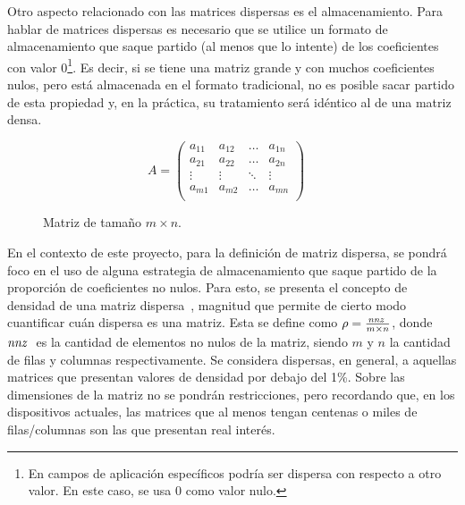 Otro aspecto relacionado con las matrices dispersas es el almacenamiento. Para hablar de matrices dispersas es necesario que se utilice un formato de almacenamiento que saque partido (al menos que lo intente) de los coeficientes con valor 0\footnote{En campos de aplicación específicos podría ser dispersa con respecto a otro valor. En este caso, se usa 0 como valor nulo.}. Es decir, si se tiene una matriz grande y con muchos coeficientes nulos, pero está almacenada en el formato tradicional, no es posible sacar partido de esta propiedad y, en la práctica, su tratamiento será idéntico al de una matriz densa.

\begin{figure}
    \centering
     $$ A = 
    \begin{pmatrix} 
    a_{11} & a_{12} & \dots & a_{1n} \\
    a_{21} & a_{22} & \dots & a_{2n} \\
    \vdots & \vdots & \ddots  & \vdots\\
    a_{m1} & a_{m2} & \dots & a_{mn} \\
    \end{pmatrix}
    \quad
    $$
    \caption{Matriz de tamaño $m\times n$.}
    \label{fig:A-matrix}
\end{figure}




En el contexto de este proyecto, para la definición de matriz dispersa, se pondrá foco en el uso de alguna estrategia de almacenamiento que saque partido de la proporción de coeficientes no nulos. Para esto, se presenta el concepto de densidad de una matriz dispersa~\cite{density-matlab}, magnitud que permite de cierto modo cuantificar cuán dispersa es una matriz. Esta se define como $\rho = \frac{\textit{nnz }}{m \times n}$, donde $\textit{nnz }$ es la cantidad de elementos no nulos de la matriz, siendo $m$ y $n$ la cantidad de filas y columnas respectivamente. Se considera dispersas, en general, a aquellas matrices que presentan valores de densidad por debajo del 1\%. Sobre las dimensiones de la matriz no se pondrán restricciones, pero recordando que, en los dispositivos actuales, las matrices que al menos tengan centenas o miles  de filas/columnas son las que presentan real interés. 

